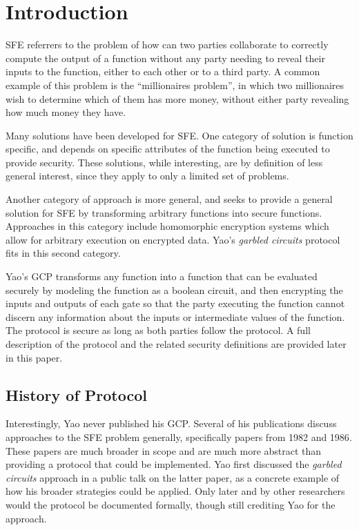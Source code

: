 \section{Introduction}

\ac{SFE} referrers to the problem of how can two parties collaborate to correctly compute the output of a function without any party needing to reveal their inputs to the function, either to each other or to a third party.  A common example of this problem is the ``millionaires problem'', in which two millionaires wish to determine which of them has more money, without either party revealing how much money they have\cite{yao1982protocols}.

Many solutions have been developed for \ac{SFE}. One category of solution is function specific, and depends on specific attributes of the function being executed to provide security\cite{huang2011faster}.  These solutions, while interesting, are by definition of less general interest, since they apply to only a limited set of problems.

Another category of approach is more general, and seeks to provide a general solution for \ac{SFE} by transforming arbitrary functions into secure functions. Approaches in this category include homomorphic encryption systems\cite{gentry2009fully} which allow for arbitrary execution on encrypted data.  Yao's \emph{garbled circuits} protocol fits in this second category.

Yao's \ac{GCP} transforms any function into a function that can be evaluated securely by modeling the function as a boolean circuit, and then encrypting the inputs and outputs of each gate so that the party executing the function cannot discern any information about the inputs or intermediate values of the function. The protocol is secure as long as both parties follow the protocol. A full description of the protocol and the related security definitions are provided later in this paper.

\subsection{History of Protocol}

Interestingly, Yao never published his \ac{GCP}. Several of his publications discuss approaches to the \ac{SFE} problem generally, specifically papers from 1982\cite{yao1982protocols} and 1986\cite{yao1986generate}. These papers are much broader in scope and are much more abstract than providing a protocol that could be implemented. Yao first discussed the \emph{garbled circuits} approach in a public talk on the latter paper, as a concrete example of how his broader strategies could be applied\cite{bellare2012foundations}. Only later and by other researchers would the protocol be documented formally\cite{goldreich1987play}, though still crediting Yao for the approach.

